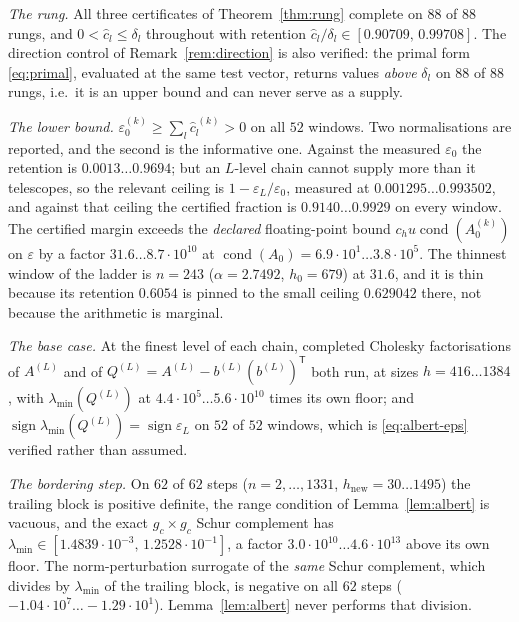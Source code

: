 \documentclass[11pt,a4paper]{article}
\theoremstyle{plain}
\theoremstyle{definition}
\newcommand{\T}{\mathsf{T}}
\newcommand{\lmin}{\lambda_{\min}}
\newcommand{\cond}{\operatorname{cond}}
\begin{document}
\emph{The rung.} All three certificates of Theorem~\ref{thm:rung} complete on
$88$ of $88$ rungs, and $0<\widehat c_{l}\le\delta_{l}$ throughout with retention
$\widehat c_{l}/\delta_{l}\in[0.90709,\,0.99708]$. The direction control of
Remark~\ref{rem:direction} is also verified: the primal form \eqref{eq:primal},
evaluated at the same test vector, returns values \emph{above} $\delta_{l}$ on $88$
of $88$ rungs, i.e.\ it is an upper bound and can never serve as a supply.

\emph{The lower bound.} $\varepsilon^{(k)}_{0}\ge\sum_{l}\widehat c^{\,(k)}_{l}>0$ on
all $52$ windows. Two normalisations are reported, and the second is the informative
one. Against the measured $\varepsilon_{0}$ the retention is
$0.0013\dots0.9694$; but an $L$-level chain cannot supply more than it telescopes, so
the relevant ceiling is $1-\varepsilon_{L}/\varepsilon_{0}$, measured at
$0.001295\dots0.993502$, and against that ceiling the certified fraction is
$0.9140\dots0.9929$ on every window. The certified margin exceeds the \emph{declared}
floating-point bound $c_{h}u\cond(A^{(k)}_{0})$ on $\varepsilon$ by a factor
$31.6\dots8.7\cdot10^{10}$ at $\cond(A_{0})=6.9\cdot10^{1}\dots3.8\cdot10^{5}$. The
thinnest window of the ladder is $n=243$ ($\alpha=2.7492$, $h_{0}=679$) at $31.6$,
and it is thin because its retention $0.6054$ is pinned to the small ceiling
$0.629042$ there, not because the arithmetic is marginal.

\emph{The base case.} At the finest level of each chain, completed Cholesky
factorisations of $A^{(L)}$ and of $Q^{(L)}=A^{(L)}-b^{(L)}(b^{(L)})^{\T}$ both run,
at sizes $h=416\dots1384$, with $\lmin(Q^{(L)})$ at
$4.4\cdot10^{5}\dots5.6\cdot10^{10}$ times its own floor; and
$\operatorname{sign}\lmin(Q^{(L)})=\operatorname{sign}\varepsilon_{L}$ on $52$ of
$52$ windows, which is \eqref{eq:albert-eps} verified rather than assumed.

\emph{The bordering step.} On $62$ of $62$ steps ($n=2,\dots,1331$,
$h_{\mathrm{new}}=30\dots1495$) the trailing block is positive definite, the range
condition of Lemma~\ref{lem:albert} is vacuous, and the exact
$g_{c}\times g_{c}$ Schur complement has
$\lmin\in[1.4839\cdot10^{-3},\,1.2528\cdot10^{-1}]$, a factor
$3.0\cdot10^{10}\dots4.6\cdot10^{13}$ above its own floor. The norm-perturbation
surrogate of the \emph{same} Schur complement, which divides by
$\lmin$ of the trailing block, is negative on all $62$ steps
($-1.04\cdot10^{7}\dots-1.29\cdot10^{1}$). Lemma~\ref{lem:albert} never performs
that division.
\end{document}
